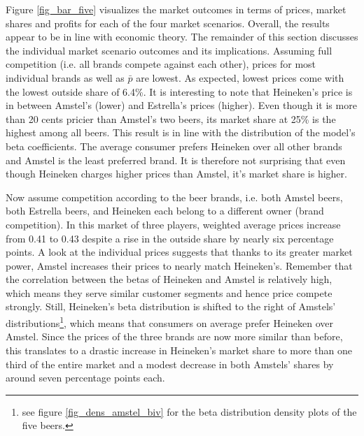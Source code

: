 \documentclass[12pt,a4paper]{article}
\begin{document}
Figure \ref{fig_bar_five} visualizes the market outcomes in terms of prices, market shares and profits for each of the four market scenarios.
Overall, the results appear to be in line with economic theory.
The remainder of this section discusses the individual market scenario outcomes and its implications.
Assuming full competition (i.e. all brands compete against each other), prices for most individual brands as well as $\bar{p}$ are lowest.
As expected, lowest prices come with the lowest outside share of 6.4\%.
It is interesting to note that Heineken's price is in between Amstel's (lower) and Estrella's prices (higher).
Even though it is more than 20 cents pricier than Amstel's two beers, its market share at 25\% is the highest among all beers.
This result is in line with the distribution of the model's beta coefficients.
The average consumer prefers Heineken over all other brands and Amstel is the least preferred brand.
It is therefore not surprising that even though Heineken charges higher prices than Amstel, it's market share is higher.

Now assume competition according to the beer brands, i.e. both Amstel beers, both Estrella beers, and Heineken each belong to a different owner (brand competition).
In this market of three players, weighted average prices increase from 0.41 to 0.43\text{ \euro } despite a rise in the outside share by nearly six percentage points.
A look at the individual prices suggests that thanks to its greater market power, Amstel increases their prices to nearly match Heineken's.
Remember that the correlation between the betas of Heineken and Amstel is relatively high, which means they serve similar customer segments and hence price compete strongly.
Still, Heineken's beta distribution is shifted to the right of Amstels' distributions\footnote{see figure \ref{fig_dens_amstel_biv} for the beta distribution density plots of the five beers.}, which means that consumers on average prefer Heineken over Amstel.
Since the prices of the three brands are now more similar than before, this translates to a drastic increase in Heineken's market share to more than one third of the entire market and a modest decrease in both Amstels' shares by around seven percentage points each.
\end{document}
